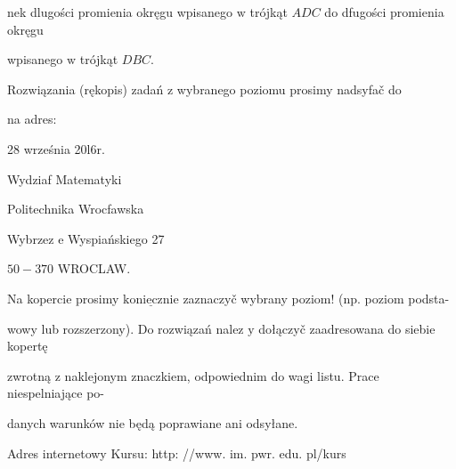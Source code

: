 \documentclass[a4paper,12pt]{article}
\begin{document}
nek dlugości promienia okręgu wpisanego $\mathrm{w}$ trójkąt $ADC$ do dfugości promienia okręgu

wpisanego $\mathrm{w}$ trójkąt $DBC.$

Rozwiązania (rękopis) zadań z wybranego poziomu prosimy nadsyfač do

na adres:

28 września 20l6r.

Wydziaf Matematyki

Politechnika Wrocfawska

Wybrzez $\mathrm{e}$ Wyspiańskiego 27

$50-370$ WROCLAW.

Na kopercie prosimy $\underline{\mathrm{k}\mathrm{o}\mathrm{n}\mathrm{i}\mathrm{e}\mathrm{c}\mathrm{z}\mathrm{n}\mathrm{i}\mathrm{e}}$ zaznaczyč wybrany poziom! (np. poziom podsta-

wowy lub rozszerzony). Do rozwiązań nalez $\mathrm{y}$ dołączyč zaadresowana do siebie kopertę

zwrotną $\mathrm{z}$ naklejonym znaczkiem, odpowiednim do wagi listu. Prace niespelniające po-

danych warunków nie będą poprawiane ani odsyłane.

Adres internetowy Kursu: http: //www. im. pwr. edu. pl/kurs
\end{document}
